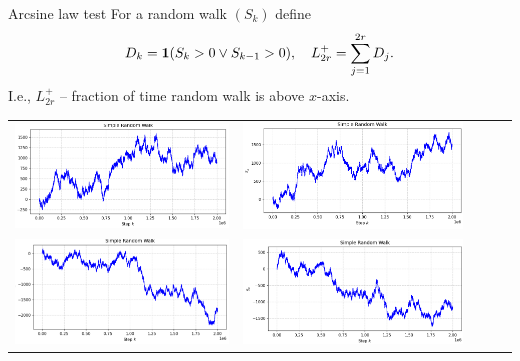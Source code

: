 \documentclass[aspectratio=169]{beamer}
\begin{document}
\begin{frame}{Arcsine law test}
For a random walk $(S_k)$ define
\[
D_k=\boldsymbol{1}{(S_k>0 \vee S_{k-1}>0)},\quad
L^+_{2r}=\sum_{j=1}^{2r}D_j.
\]
I.e., $L^+_{2r}$ -- fraction of time random walk is above $x$-axis.
\medskip\par\noindent
\begin{center}
\begin{tabular}{lllll}
 \includegraphics[scale=0.15]{pics/arcsine_walk1.png} &
  \includegraphics[scale=0.15]{pics/arcsine_walk2.png}\\
 \includegraphics[scale=0.15]{pics/arcsine_walk3.png} &
  \includegraphics[scale=0.15]{pics/arcsine_walk4.png}\\

\end{tabular}
\end{center}
\end{frame}
\end{document}
